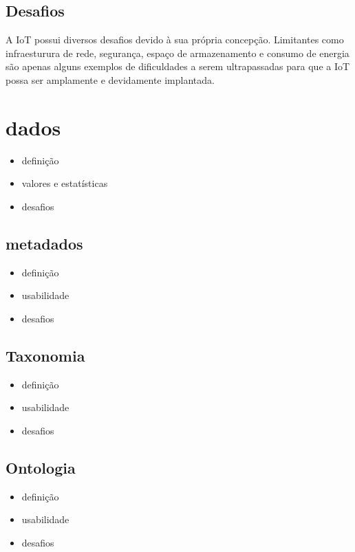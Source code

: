 \subsection{Desafios}
	A \acrlong{IoT} possui diversos desafios devido à sua própria concepção. Limitantes
	como infraesturura de rede, segurança, espaço de armazenamento e consumo de energia são apenas
	alguns exemplos de dificuldades a serem ultrapassadas para que a \acrshort{IoT} possa ser amplamente
	e devidamente implantada.


\section{dados}%
	\begin{itemize}
		\item definição
		\item valores e estatísticas
		\item desafios
	\end{itemize}
	\subsection{metadados}
		\begin{itemize}
			\item definição
			\item usabilidade
			\item desafios
		\end{itemize}
	\subsection{Taxonomia}
		\begin{itemize}
			\item definição
			\item usabilidade
			\item desafios
		\end{itemize}
	\subsection{Ontologia}
		\begin{itemize}
			\item definição
		 	\item usabilidade
			\item desafios
		\end{itemize}
